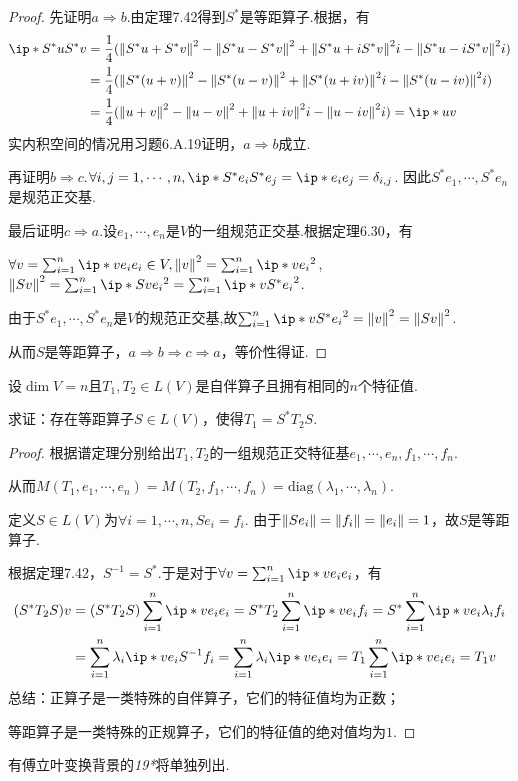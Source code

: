 \begin{proof}
    先证明\(a \Rightarrow b\).由定理7.42得到\(S^*\)是等距算子.根据，有
    \begin{align*}
        \ip*{S^*u}{S^*v}&=\dfrac{1}{4}(\norm*{S^*u+S^*v}^2-\norm*{S^*u-S^*v}^2+\norm*{S^*u+iS^*v}^2i-\norm*{S^*u-iS^*v}^2i) \\
        &=\dfrac{1}{4}(\norm*{S^*(u+v)}^2-\norm*{S^*(u-v)}^2+\norm*{S^*(u+iv)}^2i-\norm*{S^*(u-iv)}^2i) \\
        &=\dfrac{1}{4}(\norm*{u+v}^2-\norm*{u-v}^2+\norm*{u+iv}^2i-\norm*{u-iv}^2i)=\ip*{u}{v}
    \end{align*}
    实内积空间的情况用习题6.A.19证明，\(a \Rightarrow b\)成立.

    再证明\(b \Rightarrow c\).\(\forall i,j=1,\cdots,n,\ip*{S^*e_i}{S^*e_j}=\ip*{e_i}{e_j}=\delta_{i,j}\).
    因此\(S^*e_1,\cdots,S^*e_n\)是规范正交基.

    最后证明\(c \Rightarrow a\).设\(e_1,\cdots,e_n\)是\(V\)的一组规范正交基.根据定理6.30，有

    \(\forall v=\sum_{i=1}^n \ip*{v}{e_i}e_i \in V,\norm*{v}^2=\sum_{i=1}^n \ip*{v}{e_i}^2\),
    \(\norm*{Sv}^2=\sum_{i=1}^n \ip*{Sv}{e_i}^2=\sum_{i=1}^n \ip*{v}{S^*e_i}^2\).

    由于\(S^*e_1,\cdots,S^*e_n\)是\(V\)的规范正交基,故\(\sum_{i=1}^n \ip*{v}{S^*e_i}^2=\norm*{v}^2=\norm*{Sv}^2\).

    从而\(S\)是等距算子，\(a \Rightarrow b \Rightarrow c \Rightarrow a\)，等价性得证.
\end{proof}

\begin{problem}[11]\label{7.C.11}
    设\(\dim V=n\)且\(T_1,T_2 \in L(V)\)是自伴算子且拥有相同的\(n\)个特征值.

    求证：存在等距算子\(S \in L(V)\)，使得\(T_1=S^*T_2S\).
\end{problem}

\begin{proof}
    根据谱定理分别给出\(T_1,T_2\)的一组规范正交特征基\(e_1,\cdots,e_n,f_1,\cdots,f_n\).

    从而\(M(T_1,e_1,\cdots,e_n)=M(T_2,f_1,\cdots,f_n)=\mathrm{diag}(\lambda_1,\cdots,\lambda_n)\).
    
    定义\(S \in L(V)\)为\(\forall i=1,\cdots,n,Se_i=f_i\).
    由于\(\norm*{Se_i}=\norm*{f_i}=\norm*{e_i}=1\)，故\(S\)是等距算子.
    
    根据定理7.42，\(S^{-1}=S^*\).于是对于\(\forall v=\sum_{i=1}^n \ip*{v}{e_i}e_i\)，有
    \begin{align*}
        (S^*T_2S)v&=(S^*T_2S)\sum_{i=1}^n \ip*{v}{e_i}e_i=S^*T_2\sum_{i=1}^n \ip*{v}{e_i}f_i
        =S^*\sum_{i=1}^n \ip*{v}{e_i}\lambda_if_i \\
        &=\sum_{i=1}^n \lambda_i\ip*{v}{e_i}S^{-1}f_i
        =\sum_{i=1}^n \lambda_i\ip*{v}{e_i}e_i=T_1\sum_{i=1}^n \ip*{v}{e_i}e_i=T_1v
    \end{align*}
    总结：正算子是一类特殊的自伴算子，它们的特征值均为正数；

    等距算子是一类特殊的正规算子，它们的特征值的绝对值均为\(1\).
\end{proof}

{\kaishu 有傅立叶变换背景的\textit{19*}将单独列出.}

